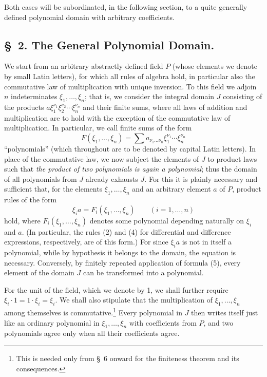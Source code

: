 \documentclass[11pt]{article}
\begin{document}
Both cases will be subordinated, in the following section, to a quite generally defined polynomial domain with arbitrary coefficients.

\subsection*{\S~2. The General Polynomial Domain.}

We start from an arbitrary abstractly defined field $P$ (whose elements we denote by small Latin letters), for which all rules of algebra hold, in particular also the commutative law of multiplication with unique inversion. To this field we adjoin $n$ indeterminates $\xi_1,\ldots,\xi_n$; that is, we consider the integral domain $J$ consisting of the products $a\xi_1^{\nu_1}\xi_2^{\nu_2}\cdots\xi_n^{\nu_n}$ and their finite sums, where all laws of addition and multiplication are to hold with the exception of the commutative law of multiplication. In particular, we call finite sums of the form
\[
 F(\xi_1,\ldots,\xi_n)=\sum a_{\nu_1\ldots\nu_n}\xi_1^{\nu_1}\cdots\xi_n^{\nu_n}
\]
``polynomials'' (which throughout are to be denoted by capital Latin letters). In place of the commutative law, we now subject the elements of $J$ to product laws such that \emph{the product of two polynomials is again a polynomial}; thus the domain of all polynomials from $J$ already exhausts $J$. For this it is plainly necessary and sufficient that, for the elements $\xi_1,
\ldots,\xi_n$ and an arbitrary element $a$ of $P$, product rules of the form
\begin{equation}
 \xi_i a=F_i(\xi_1,\ldots,\xi_n)\qquad (i=1,\ldots,n)
\tag{5}
\end{equation}
hold, where $F_i(\xi_1,\ldots,\xi_n)$ denotes some polynomial depending naturally on $\xi_i$ and $a$. (In particular, the rules (2) and (4) for differential and difference expressions, respectively, are of this form.) For since $\xi_i a$ is not in itself a polynomial, while by hypothesis it belongs to the domain, the equation is necessary. Conversely, by finitely repeated application of formula (5), every element of the domain $J$ can be transformed into a polynomial.

For the unit of the field, which we denote by 1, we shall further require $\xi_i\cdot1=1\cdot\xi_i=\xi_i$. We shall also stipulate that the multiplication of $\xi_1,\ldots,\xi_n$ among themselves is commutative.\footnote{This is needed only from \S~6 onward for the finiteness theorem and its consequences.} Every polynomial in $J$ then writes itself just like an ordinary polynomial in $\xi_1,\ldots,\xi_n$ with coefficients from $P$, and two polynomials agree only when all their coefficients agree.
\end{document}
